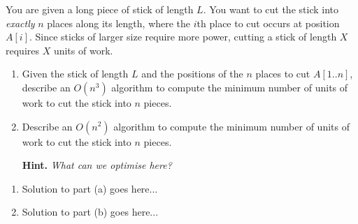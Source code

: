 \documentclass{article}
\begin{document}
\begin{question}
You are given a long piece of stick of length $L$. You want to cut the stick into {\em exactly} $n$ places along its length, where the $i$th place to cut occurs at position $A[i]$. Since sticks of larger size require more power, cutting a stick of length $X$ requires $X$ units of work.

\begin{enumerate}[label = (\alph*)]
    \item Given the stick of length $L$ and the positions of the $n$ places to cut $A[1..n]$, describe an $O(n^3)$ algorithm to compute the minimum number of units of work to cut the stick into $n$ pieces.

    \item Describe an $O(n^2)$ algorithm to compute the minimum number of units of work to cut the stick into $n$ pieces.

    {\bfseries Hint.} {\em What can we optimise here?}
\end{enumerate}
\end{question}

\begin{solution}
\begin{enumerate}[label = (\alph*)]
    \item Solution to part (a) goes here...

    \item Solution to part (b) goes here...
\end{enumerate}
\end{solution}
\end{document}
